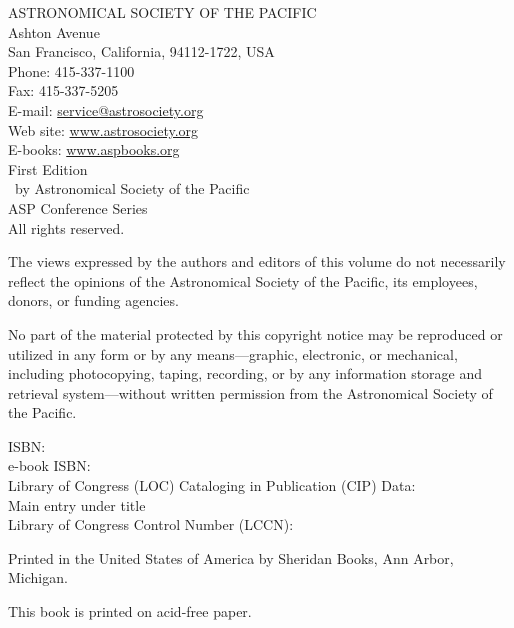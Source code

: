 \null
\setlength{\headheight}{0cm}
\setlength{\headsep}{0cm}
\setlength{\textheight}{8.3in}
\setlength{\footskip}{0cm}
\pagestyle{empty}
\vfill
{\footnotesize
\begin{center}
ASTRONOMICAL SOCIETY OF THE PACIFIC\\
 Ashton Avenue\\
San Francisco, California, 94112-1722, USA\\
\medskip
Phone: 415-337-1100\\
Fax: 415-337-5205\\
E-mail: \url{service@astrosociety.org}\\
Web site: \url{www.astrosociety.org}\\
E-books: \url{www.aspbooks.org}\\
\bigskip
First Edition\\
\raisebox{1.5pt}{\tiny\copyright}\hspace{2pt}\cpryear\ by Astronomical Society of the Pacific\\
ASP Conference Series\\
All rights reserved.\\
\medskip
\end{center}
The views expressed by the authors and editors of this volume do not necessarily reflect the opinions of the Astronomical Society of the Pacific, its employees, donors, or funding agencies.

\medskip
No part of the material protected by this copyright notice may be
reproduced or utilized in any form or by any means---graphic,
electronic, or mechanical, including photocopying, taping,
recording, or by any information storage and retrieval
system---without written permission from the Astronomical Society of the Pacific.\\
\bigskip
\begin{center}
ISBN:~\ISBN \\
e-book ISBN:~\eISBN \\
\bigskip
Library of Congress (LOC) Cataloging in Publication (CIP) Data:\\
Main entry under title\\
Library of Congress Control Number (LCCN):~\LCCN \\
\end{center}
\begin{center}
Printed in the United States of America by Sheridan Books, Ann Arbor, Michigan.

This book is printed on acid-free paper.
\end{center}
}
